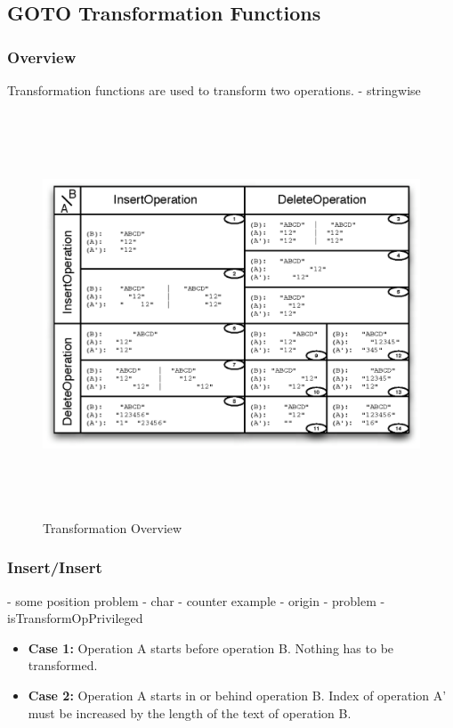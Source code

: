 \subsection{GOTO Transformation Functions}

\subsubsection{Overview}
Transformation functions are used to transform two operations.
- stringwise

\begin{figure}[H]
\centering
\includegraphics[height=12cm,width=16cm]{../../images/algo-impl/transform_overview.eps}
\caption{Transformation Overview}
\end{figure}

\subsubsection{Insert/Insert}
- some position problem
  - char
    - counter example
  - origin
    - problem
  - isTransformOpPrivileged
\begin{itemize}
\item \textbf{Case 1:}
Operation A starts before operation B. Nothing has to be transformed.
\item \textbf{Case 2:}
Operation A starts in or behind operation B. Index of operation A' must be increased by the length of the text of operation B.
\end{itemize}

